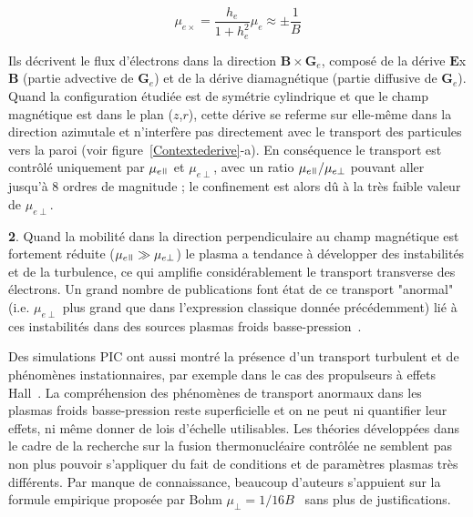 \begin{refsection}
\begin{equation}
\mu_{e\times}=\frac{h_e}{1+h_e^2}\mu_e\approx\pm\frac{1}{B}
\end{equation}

Ils décrivent le flux d'électrons dans la direction $\mathbf
B\times\mathbf G_e$, composé de la dérive $\mathbf E$x$\mathbf B$ (partie
advective de $\mathbf G_e$) et de la dérive diamagnétique (partie diffusive de
$\mathbf G_e$). Quand la configuration étudiée est de symétrie cylindrique et
que le champ magnétique est dans le plan ($z$,$r$), cette dérive se referme sur elle-même dans la direction
azimutale et n'interfère pas directement avec le transport des particules vers
la paroi (voir figure~\ref{Contextederive}-a). En conséquence le transport est
contrôlé uniquement par $\mu_{e\para}$ et $\mu_{e\perp}$, avec un ratio $\mu_{e\para}/\mu_{e\perp}$ pouvant aller
jusqu'à 8 ordres de magnitude ; le confinement est alors dû à la très faible
valeur de $\mu_{e\perp}$.
\vspace{1cm}

\textbf{2}. Quand la mobilité dans la direction perpendiculaire au champ
magnétique est fortement réduite ($\mu_{e\para}\gg\mu_{e\perp}$) le plasma a tendance à
développer des instabilités et de la turbulence, ce qui amplifie
considérablement le transport transverse des électrons. Un grand nombre de
publications font état de ce transport "anormal" (i.e.
$\mu_{e\perp}$ plus grand que dans l'expression classique donnée précédemment)
lié à ces instabilités dans des sources plasmas froids
basse-pression~\parencite{Bradley,Adam}.

Des simulations PIC ont aussi montré
la présence d'un transport turbulent et de phénomènes instationnaires, par
exemple dans le cas des propulseurs à effets Hall~\cite{Adam08}. La
compréhension des phénomènes de transport anormaux dans les plasmas froids
basse-pression reste superficielle et on ne peut ni quantifier leur effets, ni
même donner de lois d'échelle utilisables.
Les théories développées dans le cadre de la recherche sur la fusion
thermonucléaire contrôlée ne semblent pas non plus pouvoir s'appliquer du fait de conditions et
de paramètres plasmas très différents. Par manque de connaissance,
beaucoup d'auteurs s'appuient sur la formule empirique proposée par Bohm
$\mu_\perp=1/16B$~\parencite{Bohm} sans plus de justifications.
\vspace{1cm}


\end{refsection}
